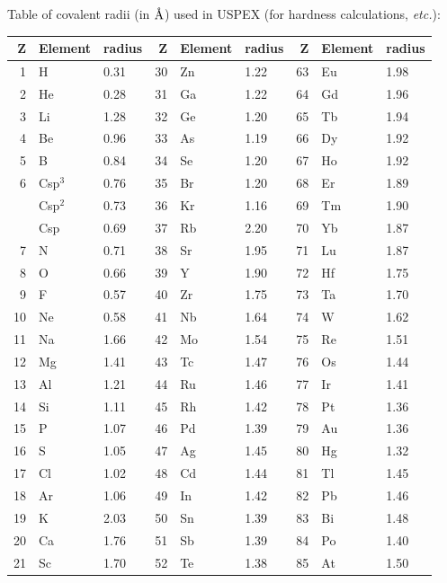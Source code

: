 \documentclass[12pt]{article}
\begin{document}
Table of covalent radii (in $\text{\r{A}}$) used in USPEX (for hardness
calculations, \emph{etc.}):

\begin{center}
\begin{tabular}{|r|l|l||r|l|l||r|l|l|}
\hline
Z & Element & radius & Z & Element & radius & Z & Element & radius \\
\hline
1  & H       & 0.31 & 30 & Zn & 1.22 & 63 & Eu & 1.98 \\
2  & He      & 0.28 & 31 & Ga & 1.22 & 64 & Gd & 1.96 \\
3  & Li      & 1.28 & 32 & Ge & 1.20 & 65 & Tb & 1.94 \\
4  & Be      & 0.96 & 33 & As & 1.19 & 66 & Dy & 1.92 \\
5  & B       & 0.84 & 34 & Se & 1.20 & 67 & Ho & 1.92 \\
6  & Csp$^3$ & 0.76 & 35 & Br & 1.20 & 68 & Er & 1.89 \\
   & Csp$^2$ & 0.73 & 36 & Kr & 1.16 & 69 & Tm & 1.90 \\
   & Csp     & 0.69 & 37 & Rb & 2.20 & 70 & Yb & 1.87 \\
7  & N       & 0.71 & 38 & Sr & 1.95 & 71 & Lu & 1.87 \\
8  & O       & 0.66 & 39 & Y  & 1.90 & 72 & Hf & 1.75 \\
9  & F       & 0.57 & 40 & Zr & 1.75 & 73 & Ta & 1.70 \\
10 & Ne      & 0.58 & 41 & Nb & 1.64 & 74 & W  & 1.62 \\
11 & Na      & 1.66 & 42 & Mo & 1.54 & 75 & Re & 1.51 \\
12 & Mg      & 1.41 & 43 & Tc & 1.47 & 76 & Os & 1.44 \\
13 & Al      & 1.21 & 44 & Ru & 1.46 & 77 & Ir & 1.41 \\
14 & Si      & 1.11 & 45 & Rh & 1.42 & 78 & Pt & 1.36 \\
15 & P       & 1.07 & 46 & Pd & 1.39 & 79 & Au & 1.36 \\
16 & S       & 1.05 & 47 & Ag & 1.45 & 80 & Hg & 1.32 \\
17 & Cl      & 1.02 & 48 & Cd & 1.44 & 81 & Tl & 1.45 \\
18 & Ar      & 1.06 & 49 & In & 1.42 & 82 & Pb & 1.46 \\
19 & K       & 2.03 & 50 & Sn & 1.39 & 83 & Bi & 1.48 \\
20 & Ca      & 1.76 & 51 & Sb & 1.39 & 84 & Po & 1.40 \\
21 & Sc      & 1.70 & 52 & Te & 1.38 & 85 & At & 1.50 \\

\end{tabular}
\end{center}
\end{document}
